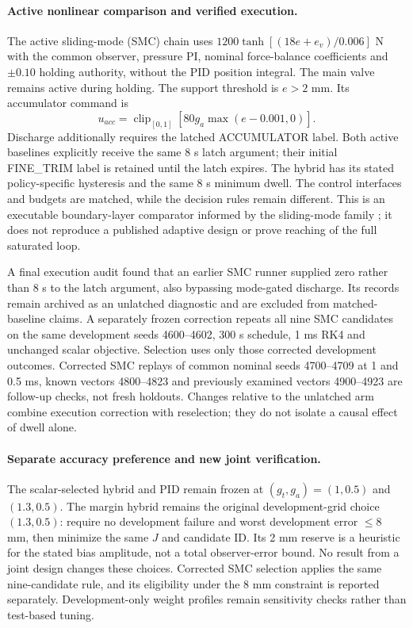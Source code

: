 \paragraph{Active nonlinear comparison and verified execution.}
The active sliding-mode (SMC) chain uses $1200\tanh[(18e+e_v)/0.006]$ N with the common observer, pressure PI, nominal force-balance coefficients and $\pm0.10$ holding authority, without the PID position integral. The main valve remains active during holding. The support threshold is $e>2$ mm. Its accumulator command is
\[
u_{acc}=\operatorname{clip}_{[0,1]}[80g_a\max(e-0.001,0)].
\]
Discharge additionally requires the latched ACCUMULATOR label. Both active baselines explicitly receive the same 8 s latch argument; their initial FINE\_TRIM label is retained until the latch expires. The hybrid has its stated policy-specific hysteresis and the same 8 s minimum dwell. The control interfaces and budgets are matched, while the decision rules remain different. This is an executable boundary-layer comparator informed by the sliding-mode family \cite{tang2011,guan2008}; it does not reproduce a published adaptive design or prove reaching of the full saturated loop.

A final execution audit found that an earlier SMC runner supplied zero rather than 8 s to the latch argument, also bypassing mode-gated discharge. Its records remain archived as an unlatched diagnostic and are excluded from matched-baseline claims. A separately frozen correction repeats all nine SMC candidates on the same development seeds 4600--4602, 300 s schedule, 1 ms RK4 and unchanged scalar objective. Selection uses only those corrected development outcomes. Corrected SMC replays of common nominal seeds 4700--4709 at 1 and 0.5 ms, known vectors 4800--4823 and previously examined vectors 4900--4923 are follow-up checks, not fresh holdouts. Changes relative to the unlatched arm combine execution correction with reselection; they do not isolate a causal effect of dwell alone.

\paragraph{Separate accuracy preference and new joint verification.}
The scalar-selected hybrid and PID remain frozen at $(g_t,g_a)=(1,0.5)$ and $(1.3,0.5)$. The margin hybrid remains the original development-grid choice $(1.3,0.5)$: require no development failure and worst development error $\le8$ mm, then minimize the same $J$ and candidate ID. Its 2 mm reserve is a heuristic for the stated bias amplitude, not a total observer-error bound. No result from a joint design changes these choices. Corrected SMC selection applies the same nine-candidate rule, and its eligibility under the 8 mm constraint is reported separately. Development-only weight profiles remain sensitivity checks rather than test-based tuning.

